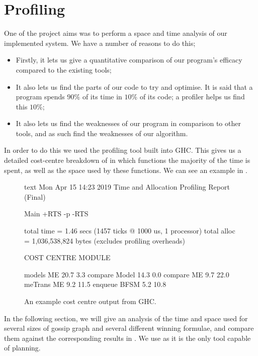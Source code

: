 \documentclass[10pt, a4paper]{report}
\begin{document}
\section{Profiling}

One of the project aims was to perform a space and time analysis of our
implemented system. We have a number of reasons to do this;

\begin{itemize}
\setlength\itemsep{1em}
\item Firstly, it lets us give a quantitative comparison of our program's
  efficacy compared to the existing tools;
\item It also lets us find the parts of our code to try and optimise. It is said
  that a program spends $90\%$ of its time in $10\%$ of its code; a profiler helps
  us find this $10\%$;
\item It also lets us find the weaknesses of our program in comparison to other
  tools, and as such find the weaknesses of our algorithm.
\end{itemize}

In order to do this we used the profiling tool built into GHC. This gives us a
detailed cost-centre breakdown of in which functions the majority of the time is
spent, as well as the space used by these functions. We can see an example in
.

\begin{figure}[h]
  \centering
\begin{cminted}{text}
	Mon Apr 15 14:23 2019 Time and Allocation Profiling Report  (Final)

	   Main +RTS -p -RTS

	total time  =        1.46 secs   (1457 ticks @ 1000 us, 1 processor)
	total alloc = 1,036,538,824 bytes  (excludes profiling overheads)

  COST CENTRE            MODULE                 %

  models                 ME                      20.7    3.3
  compare                Model                   14.3    0.0
  compare                ME                       9.7   22.0
  meTrans                ME                       9.2   11.5
  enqueue                BFSM                     5.2   10.8
\end{cminted}
  \caption{An example cost centre output from GHC.}
  \label{fig:costcentre}
\end{figure}

In the following section, we will give an analysis of the time and space used
for several sizes of gossip graph and several different winning formulae, and
compare them against the corresponding results in \cite{GithubGossip}. We use
\cite{GithubGossip} as it is the only tool capable of planning.
\end{document}
